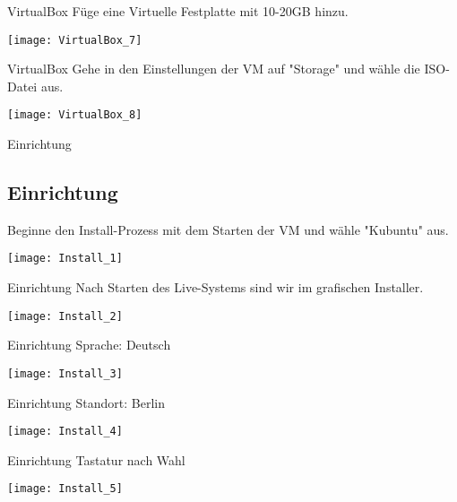 \begin{frame}{VirtualBox}
    Füge eine Virtuelle Festplatte mit 10-20GB hinzu.
    \begin{center}
        \texttt{[image: VirtualBox\_7]}
    \end{center}
\end{frame}

\begin{frame}{VirtualBox}
    Gehe in den Einstellungen der VM auf "Storage" und wähle die ISO-Datei aus.

    \begin{center}
        \texttt{[image: VirtualBox\_8]}
    \end{center}
\end{frame}

\begin{frame}{Einrichtung}
    \subsection{Einrichtung}\label{subsec:Einrichtung}
    Beginne den Install-Prozess mit dem Starten der VM und wähle "Kubuntu" aus.

    \begin{center}
        \texttt{[image: Install\_1]}
    \end{center}
\end{frame}

\begin{frame}{Einrichtung}
    Nach Starten des Live-Systems sind wir im grafischen Installer.
    \begin{center}
        \texttt{[image: Install\_2]}
    \end{center}
\end{frame}

\begin{frame}{Einrichtung}
    Sprache: Deutsch
    \begin{center}
        \texttt{[image: Install\_3]}
    \end{center}
\end{frame}

\begin{frame}{Einrichtung}
    Standort: Berlin
    \begin{center}
        \texttt{[image: Install\_4]}
    \end{center}
\end{frame}

\begin{frame}{Einrichtung}
    Tastatur nach Wahl
    \begin{center}
        \texttt{[image: Install\_5]}
    \end{center}
\end{frame}

